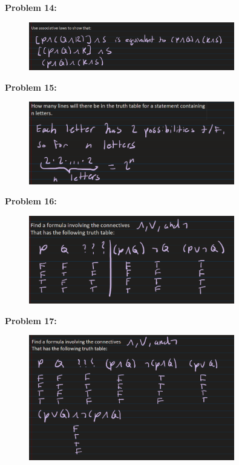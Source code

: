 \textbf{Problem 14:}
\begin{figure}[H]
    \centering
    \includegraphics[width=0.8\textwidth]{images/1.2/10.PNG}
\end{figure}

\textbf{Problem 15:}
\begin{figure}[H]
    \centering
    \includegraphics[width=0.8\textwidth]{images/1.2/11.PNG}
\end{figure}

\textbf{Problem 16:}
\begin{figure}[H]
    \centering
    \includegraphics[width=0.8\textwidth]{images/1.2/12.PNG}
\end{figure}

\textbf{Problem 17:}
\begin{figure}[H]
    \centering
    \includegraphics[width=0.8\textwidth]{images/1.2/13.PNG}
\end{figure}

